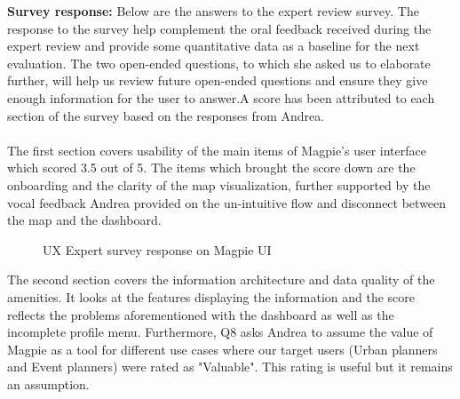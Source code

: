 \newpage
\noindent\textbf{Survey response: }
Below are the answers to the expert review survey. The response to the survey help complement the oral feedback received during the expert review and provide some quantitative data as a baseline for the next evaluation. The two open-ended questions, to which she asked us to elaborate further, will help us review future open-ended questions and ensure they give enough information for the user to answer.A score has been attributed to each section of the survey based on the responses from Andrea.\\\\
The first section covers usability of the main items of Magpie's user interface which scored 3.5 out of 5. The items which brought the score down are the onboarding and the clarity of the map visualization, further supported by the vocal feedback Andrea provided on the un-intuitive flow and disconnect between the map and the dashboard.\\
\begin{figure}
    \centering
    \caption{UX Expert survey response on Magpie UI}
\end{figure}
\newpage
The second section covers the information architecture and data quality of the amenities. It looks at the features displaying the information and the score reflects the problems aforementioned with the dashboard as well as the incomplete profile menu. Furthermore, Q8 asks Andrea to assume the value of Magpie as a tool for different use cases where our target users (Urban planners and Event planners) were rated as "Valuable". This rating is useful but it remains an assumption.\\
